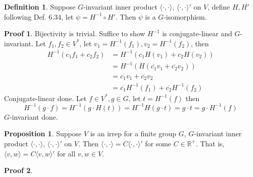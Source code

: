\documentclass{book}
\newcommand{\R}{\mathbb{R}}
\newcommand{\inner}[1]{\langle #1 \rangle}
\theoremstyle{definition}
\newtheorem{proposition}[lemma]{Proposition}
\newtheorem{definition}[lemma]{Definition}
\theoremstyle{remarkstyle}
\newtheorem*{myproof}{Proof}%
\begin{document}
\begin{definition}
    Suppose $G$-invariant inner product $\inner{\cdot,\cdot}$, $\inner{\cdot,\cdot}'$ on $V$, define $H,H'$ following Def. 6.34, let $\psi=H^{-1}\circ H' $. Then $\psi$ is a $G$-isomorphism.
\end{definition}
\begin{myproof}
    Bijectivity is trivial. Suffice to show $H^{-1} $ is conjugate-linear and $G$-invariant. \newline 
    Let $f_1,f_2\in V^*$, let $v_1=H^{-1}(f_1), v_2=H^{-1}(f_2) $, then 
    \begin{align*}
        H^{-1}(c_1f_1+c_2f_2) 
        &= H^{-1}(c_1H(v_1) + c_2H(v_2)) \\
        &= H^{-1}(H(\overline{c_1}v_1+\overline{c_2}v_2)) \\
        &= \overline{c_1}v_1+\overline{c_2}v_2 \\
        &= \overline{c_1}H^{-1}(f_1) + \overline{c_2}H^{-1}(f_2)
    \end{align*}
    Conjugate-linear done. Let $f\in V^*,g\in G$, let $t=H^{-1}(f)$ then 
    $$
    H^{-1}(g\cdot f) = H^{-1}(g\cdot H(t)) = H^{-1}H(g\cdot t) = g\cdot t = g\cdot H^{-1}(f)
    $$
    $G$-invariant done.   \newline
\end{myproof}

\begin{proposition}
    Suppose $V$ is an irrep for a finite group $G$, $G$-invariant inner product $\inner{\cdot,\cdot}$, $\inner{\cdot,\cdot}'$ on $V$. Then $\inner{\cdot,\cdot} = C\inner{\cdot,\cdot}'$ for some $C\in \R^{+}$. That is, $\inner{v,w} = C\inner{v,w}'$ for all $v,w\in V$.
\end{proposition}
\begin{myproof}
    
\end{myproof}
\end{document}
